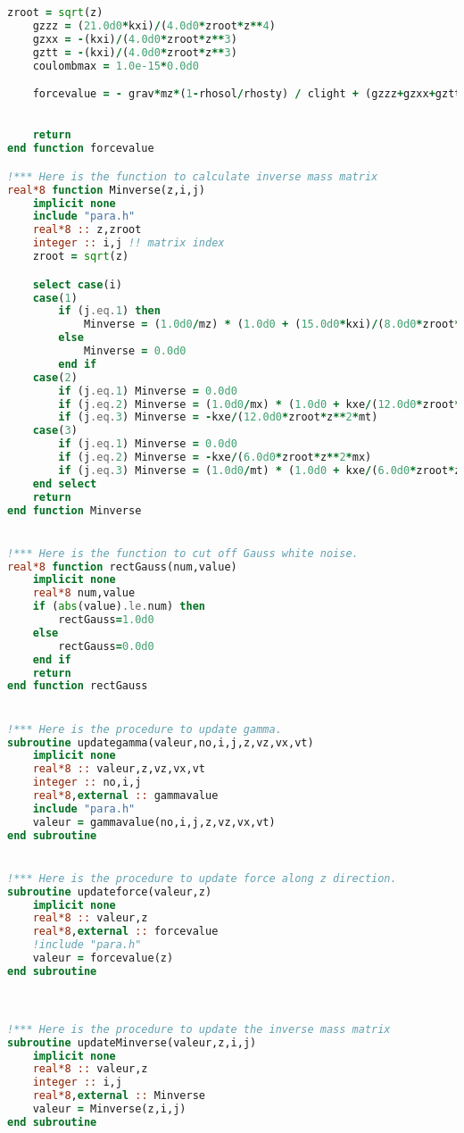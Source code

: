 \documentclass[fleqn,10pt]{InternshipReport_SI-ENS-PSL}
\begin{document}
\begin{lstlisting}[language=Fortran, caption=BEHD\_YYE.f90]
    zroot = sqrt(z)
    gzzz = (21.0d0*kxi)/(4.0d0*zroot*z**4)
    gzxx = -(kxi)/(4.0d0*zroot*z**3)
    gztt = -(kxi)/(4.0d0*zroot*z**3)
    coulombmax = 1.0e-15*0.0d0

    forcevalue = - grav*mz*(1-rhosol/rhosty) / clight + (gzzz+gzxx+gztt)/(beta*mz) / clight !+ coulombmax/(z**2)*exp(-z)
    

    return
end function forcevalue

!*** Here is the function to calculate inverse mass matrix
real*8 function Minverse(z,i,j)
    implicit none
    include "para.h"
    real*8 :: z,zroot
    integer :: i,j !! matrix index
    zroot = sqrt(z)

    select case(i)
    case(1)
        if (j.eq.1) then
            Minverse = (1.0d0/mz) * (1.0d0 + (15.0d0*kxi)/(8.0d0*zroot*z**2))
        else
            Minverse = 0.0d0
        end if
    case(2)
        if (j.eq.1) Minverse = 0.0d0
        if (j.eq.2) Minverse = (1.0d0/mx) * (1.0d0 + kxe/(12.0d0*zroot*z**2))
        if (j.eq.3) Minverse = -kxe/(12.0d0*zroot*z**2*mt)
    case(3)
        if (j.eq.1) Minverse = 0.0d0
        if (j.eq.2) Minverse = -kxe/(6.0d0*zroot*z**2*mx)
        if (j.eq.3) Minverse = (1.0d0/mt) * (1.0d0 + kxe/(6.0d0*zroot*z**2*mt))
    end select
    return
end function Minverse


!*** Here is the function to cut off Gauss white noise.
real*8 function rectGauss(num,value)
    implicit none
    real*8 num,value
    if (abs(value).le.num) then
        rectGauss=1.0d0
    else
        rectGauss=0.0d0
    end if
    return
end function rectGauss


!*** Here is the procedure to update gamma.
subroutine updategamma(valeur,no,i,j,z,vz,vx,vt)
    implicit none
    real*8 :: valeur,z,vz,vx,vt
    integer :: no,i,j
    real*8,external :: gammavalue
    include "para.h"
    valeur = gammavalue(no,i,j,z,vz,vx,vt)
end subroutine


!*** Here is the procedure to update force along z direction.
subroutine updateforce(valeur,z)
    implicit none
    real*8 :: valeur,z
    real*8,external :: forcevalue
    !include "para.h"
    valeur = forcevalue(z)
end subroutine



!*** Here is the procedure to update the inverse mass matrix
subroutine updateMinverse(valeur,z,i,j)
    implicit none
    real*8 :: valeur,z
    integer :: i,j
    real*8,external :: Minverse
    valeur = Minverse(z,i,j)
end subroutine

\end{lstlisting}
\end{document}
